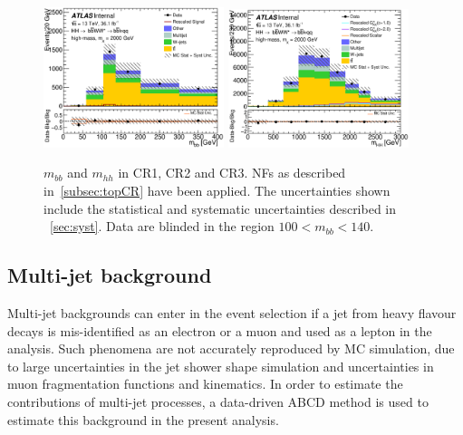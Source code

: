 \begin{figure}[!h]
\begin{center}
\includegraphics*[width=0.47\textwidth] {figures/ControlPlots_new/reOpt2000/C_reOpt2000_bbpt350_bbMass_regionA_met25d020}
\includegraphics*[width=0.47\textwidth] {figures/ControlPlots_new/reOpt2000/C_mBBcr_reOpt2000_bbpt350_hhMass_regionA_met25d020}

\caption[$m_{bb}$ and $m_{hh}$ in CR1, CR2 and CR3.]{$m_{bb}$ and $m_{hh}$ in CR1, CR2 and CR3.  \ttbar NFs as described in~\ref{subsec:topCR} have been applied. The uncertainties shown include the statistical and systematic uncertainties described in ~\ref{sec:syst}. Data are blinded in the region $100 < m_{bb} < 140 $. }
\label{fig:mbb_mhh}
\end{center}
\end{figure}

\pagebreak
\subsection{Multi-jet background}

\label{sec:multijet}
Multi-jet backgrounds can enter in the event selection if a jet from
heavy flavour decays is mis-identified as an electron or a muon and used
as a lepton in the analysis. Such phenomena are not accurately reproduced by MC
simulation, due to large uncertainties in the jet shower shape simulation
and uncertainties in muon fragmentation functions and kinematics. In order 
to estimate the contributions of multi-jet processes, a data-driven ABCD 
method is used to estimate this background in the present analysis.

